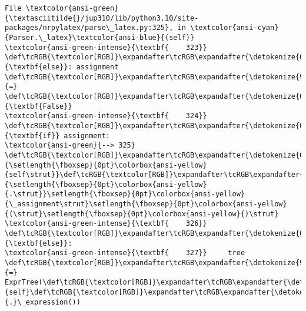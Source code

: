 \documentclass[landscape,letterpaper,10pt,english]{article}
\begin{document}
\begin{Verbatim}[commandchars=\\\{\}, frame=single, framerule=2mm, rulecolor=\color{outerrorbackground}]
File \textcolor{ansi-green}{\textasciitilde{}/jup310/lib/python3.10/site-packages/nrpylatex/parse\_latex.py:325}, in \textcolor{ansi-cyan}{Parser.\_latex}\textcolor{ansi-blue}{(self)}
\textcolor{ansi-green-intense}{\textbf{    323}} \def\tcRGB{\textcolor[RGB]}\expandafter\tcRGB\expandafter{\detokenize{0,135,0}}{\textbf{else}}: assignment \def\tcRGB{\textcolor[RGB]}\expandafter\tcRGB\expandafter{\detokenize{98,98,98}}{=} \def\tcRGB{\textcolor[RGB]}\expandafter\tcRGB\expandafter{\detokenize{0,135,0}}{\textbf{False}}
\textcolor{ansi-green-intense}{\textbf{    324}} \def\tcRGB{\textcolor[RGB]}\expandafter\tcRGB\expandafter{\detokenize{0,135,0}}{\textbf{if}} assignment:
\textcolor{ansi-green}{--> 325}     \def\tcRGB{\textcolor[RGB]}\expandafter\tcRGB\expandafter{\detokenize{0,135,0}}{\setlength{\fboxsep}{0pt}\colorbox{ansi-yellow}{self\strut}}\def\tcRGB{\textcolor[RGB]}\expandafter\tcRGB\expandafter{\detokenize{98,98,98}}{\setlength{\fboxsep}{0pt}\colorbox{ansi-yellow}{.\strut}}\setlength{\fboxsep}{0pt}\colorbox{ansi-yellow}{\_assignment\strut}\setlength{\fboxsep}{0pt}\colorbox{ansi-yellow}{(\strut}\setlength{\fboxsep}{0pt}\colorbox{ansi-yellow}{)\strut}
\textcolor{ansi-green-intense}{\textbf{    326}} \def\tcRGB{\textcolor[RGB]}\expandafter\tcRGB\expandafter{\detokenize{0,135,0}}{\textbf{else}}:
\textcolor{ansi-green-intense}{\textbf{    327}}     tree \def\tcRGB{\textcolor[RGB]}\expandafter\tcRGB\expandafter{\detokenize{98,98,98}}{=} ExprTree(\def\tcRGB{\textcolor[RGB]}\expandafter\tcRGB\expandafter{\detokenize{0,135,0}}{self}\def\tcRGB{\textcolor[RGB]}\expandafter\tcRGB\expandafter{\detokenize{98,98,98}}{.}\_expression())


\end{Verbatim}
\end{document}
